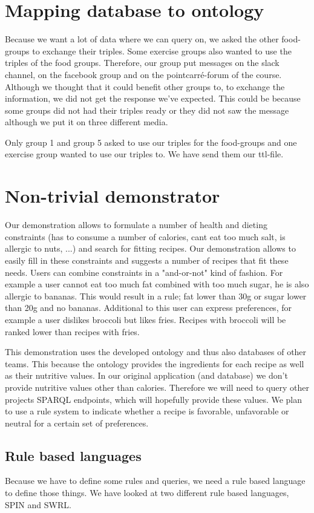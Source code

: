 \section{Mapping database to ontology}
Because we want a lot of data where we can query on, we asked the other food-groups to exchange their triples. Some exercise groups also wanted to use the triples of the food groups. Therefore, our group put messages on the slack channel, on the facebook group and on the pointcarré-forum of the course. Although we thought that it could benefit other groups to, to exchange the information, we did not get the response we've expected. This could be because some groups did not had their triples ready or they did not saw the message although we put it on three different media. 

Only group 1 and group 5 asked to use our triples for the food-groups and one exercise group wanted to use our triples to. We have send them our ttl-file. 
\section{Non-trivial demonstrator}
Our demonstration allows to formulate a number of health and dieting constraints (has to consume a number of calories, cant eat too much salt, is allergic to nuts, ...) and search for fitting recipes. Our demonstration allows to easily fill in these constraints and suggests a number of recipes that fit these needs. Users can combine constraints in a "and-or-not" kind of fashion. For example a user cannot eat too much fat combined with too much sugar, he is also allergic to bananas. This would result in a rule; fat lower than 30g or sugar lower than 20g and no bananas. Additional to this user can express preferences, for example a user dislikes broccoli but likes fries. Recipes with broccoli will be ranked lower than recipes with fries.

This demonstration uses the developed ontology and thus also databases of other teams. This because the ontology provides the ingredients for each recipe as well as their nutritive values. In our original application (and database) we don't provide nutritive values other than calories. Therefore we will need to query other projects SPARQL endpoints, which will hopefully provide these values. We plan to use a rule system to indicate whether a recipe is favorable, unfavorable or neutral for a certain set of preferences.
\subsection{Rule based languages}
Because we have to define some rules and queries, we need a rule based language to define those things. We have looked at two different rule based languages, SPIN and SWRL.
